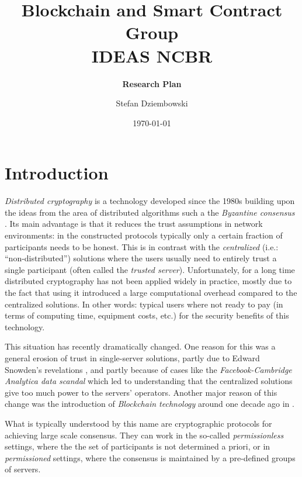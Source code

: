\documentclass{article}
\title{\textbf{Blockchain and Smart Contract Group\\ IDEAS NCBR}}
\subtitle{\textbf{Research Plan}}
\date{\today}
\author{Stefan Dziembowski}
\begin{document}
	
\maketitle

\section{Introduction}

\emph{Distributed cryptography} is a technology developed since the 1980s \cite{DBLP:conf/focs/Yao86,DBLP:conf/stoc/GoldreichMW87,DBLP:conf/crypto/ChaumCD87,DBLP:conf/stoc/Ben-OrGW88} building upon the ideas from the area of distributed algorithms such a the \emph{Byzantine consensus} \cite{DBLP:journals/toplas/LamportSP82}.  Its main advantage is that it reduces the trust assumptions in network environments: in the constructed protocols typically only a certain fraction of participants needs to be honest. This is in contrast with the \emph{centralized} (i.e.: ``non-distributed'') solutions where the users usually need to entirely trust a single participant (often called the \emph{trusted server}). Unfortunately, for a long time distributed cryptography has not been applied  widely in practice, mostly due to the fact that using it introduced a large computational overhead compared to the centralized solutions. In other words: typical users where not ready to pay (in terms of computing time, equipment costs, etc.) for the security benefits of this technology.

This situation has  recently dramatically changed. One reason for this was a general erosion of trust in single-server solutions, partly due to Edward Snowden's revelations \cite{enwiki:1029775076}, and partly because of cases like the \emph{Facebook-Cambridge Analytica data scandal} \cite{enwiki:1029165846} which led to understanding that the centralized solutions give too much power to the servers' operators. Another major reason of this change was the introduction of \emph{Blockchain technology} around one decade ago in \cite{nakamoto2008bitcoin}. 

What is typically understood by this name are cryptographic protocols for achieving large scale consensus. They can work in the so-called \emph{permissionless} settings, where the the set of participants is not determined a priori, or in \emph{permissioned} settings, where the consensus is maintained by a pre-defined groups of servers. 
\end{document}
